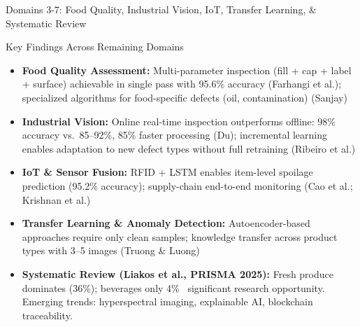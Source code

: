 \documentclass[10pt]{beamer}
\begin{document}
\begin{frame}{Domains 3-7: Food Quality, Industrial Vision, IoT, Transfer Learning, \& Systematic Review}

\scriptsize
\begin{block}{Key Findings Across Remaining Domains}
\begin{itemize}\setlength{\itemsep}{3pt}
    \item \textbf{Food Quality Assessment:} Multi-parameter inspection (fill + cap + label + surface) achievable in single pass with 95.6\% accuracy (Farhangi et al.); specialized algorithms for food-specific defects (oil, contamination) (Sanjay)
    
    \item \textbf{Industrial Vision:} Online real-time inspection outperforms offline: 98\% accuracy vs.\ 85--92\%, 85\% faster processing (Du); incremental learning enables adaptation to new defect types without full retraining (Ribeiro et al.)
    
    \item \textbf{IoT \& Sensor Fusion:} RFID + LSTM enables item-level spoilage prediction (95.2\% accuracy); supply-chain end-to-end monitoring (Cao et al.; Krishnan et al.)
    
    \item \textbf{Transfer Learning \& Anomaly Detection:} Autoencoder-based approaches require only clean samples; knowledge transfer across product types with 3--5 images (Truong \& Luong)
    
    \item \textbf{Systematic Review (Liakos et al., PRISMA 2025):} Fresh produce dominates (36\%); beverages only 4\% \textrightarrow\ significant research opportunity. Emerging trends: hyperspectral imaging, explainable AI, blockchain traceability.
\end{itemize}
\end{block}

\end{frame}
\end{document}
